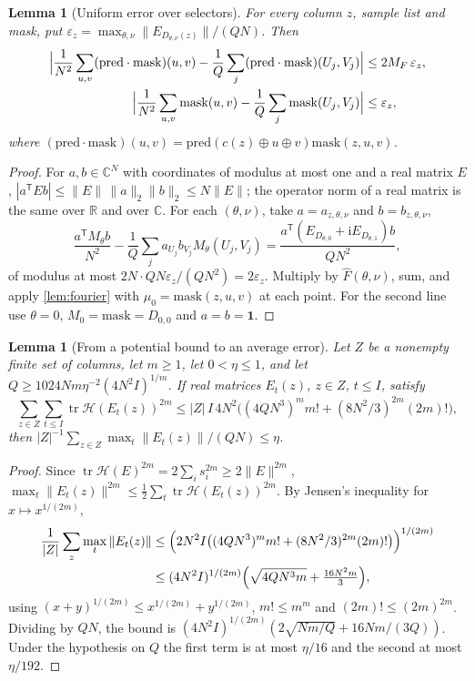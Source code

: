 \documentclass[11pt,letterpaper]{article}
\newtheorem{lemma}[theorem]{Lemma}
\theoremstyle{definition}
\theoremstyle{remark}
\newcommand{\R}{\mathbb R}
\newcommand{\C}{\mathbb C}
\newcommand{\tr}{\operatorname{tr}}
\newcommand{\mask}{\mathrm{mask}}
\newcommand{\pred}{\mathrm{pred}}
\newcommand{\cH}{\mathcal H}
\newcommand{\iu}{\mathrm i}
\begin{document}
\begin{lemma}[Uniform error over selectors]\label{lem:selector}
For every column \(z\), sample list and mask, put
\(\varepsilon_z=\max_{\theta,\nu}\|E_{D_{\theta,\nu}(z)}\|/(QN)\). Then
\begin{align*}
 \Bigl|\frac1{N^2}\sum_{u,v}(\pred\cdot\mask)(u,v)-\frac1Q\sum_{j}(\pred\cdot\mask)(U_j,V_j)\Bigr|
 &\le2M_F\,\varepsilon_z,\\
 \Bigl|\frac1{N^2}\sum_{u,v}\mask(u,v)-\frac1Q\sum_{j}\mask(U_j,V_j)\Bigr|&\le\varepsilon_z ,
\end{align*}
where \((\pred\cdot\mask)(u,v)=\pred(c(z)\oplus u\oplus v)\mask(z,u,v)\).
\end{lemma}
\begin{proof}
For \(a,b\in\C^N\) with coordinates of modulus at most one and a real
matrix \(E\), \(|a^{\mathsf T}Eb|\le\|E\|\,\|a\|_2\|b\|_2\le N\|E\|\);
the operator norm of a real matrix is the same over \(\R\) and over
\(\C\). For each \((\theta,\nu)\), take \(a=a_{z,\theta,\nu}\) and
\(b=b_{z,\theta,\nu}\),
\[
 \frac{a^{\mathsf T}M_\theta b}{N^2}-\frac1Q\sum_ja_{U_j}b_{V_j}M_\theta(U_j,V_j)
 =\frac{a^{\mathsf T}(E_{D_{\theta,0}}+\iu E_{D_{\theta,1}})b}{QN^2},
\]
of modulus at most \(2N\cdot QN\varepsilon_z/(QN^2)=2\varepsilon_z\).
Multiply by \(\widehat F(\theta,\nu)\), sum, and apply
\cref{lem:fourier} with \(\mu_0=\mask(z,u,v)\) at each point. For the
second line use \(\theta=0\), \(M_0=\mask=D_{0,0}\) and
\(a=b=\mathbf 1\).
\end{proof}

\begin{lemma}[From a potential bound to an average error]\label{lem:root}
Let \(Z\) be a nonempty finite set of columns, let \(m\ge1\), let
\(0<\eta\le1\), and let \(Q\ge1024Nm\eta^{-2}(4N^2I)^{1/m}\). If real
matrices \(E_t(z)\), \(z\in Z\), \(t\le I\), satisfy
\[
 \sum_{z\in Z}\sum_{t\le I}\tr\cH(E_t(z))^{2m}
 \le|Z|\,I\,4N^2\bigl((4QN^3)^mm!+(8N^2/3)^{2m}(2m)!\bigr),
\]
then \(|Z|^{-1}\sum_{z\in Z}\max_t\|E_t(z)\|/(QN)\le\eta\).
\end{lemma}
\begin{proof}
Since \(\tr\cH(E)^{2m}=2\sum_is_i^{2m}\ge2\|E\|^{2m}\),
\(\max_t\|E_t(z)\|^{2m}\le\frac12\sum_t\tr\cH(E_t(z))^{2m}\). By Jensen's
inequality for \(x\mapsto x^{1/(2m)}\),
\begin{align*}
 \frac1{|Z|}\sum_z\max_t\|E_t(z)\|
 &\le\Bigl(2N^2I\bigl((4QN^3)^mm!+(8N^2/3)^{2m}(2m)!\bigr)\Bigr)^{1/(2m)}\\
 &\le(4N^2I)^{1/(2m)}\Bigl(\sqrt{4QN^3m}+\tfrac{16N^2m}{3}\Bigr),
\end{align*}
using \((x+y)^{1/(2m)}\le x^{1/(2m)}+y^{1/(2m)}\), \(m!\le m^m\) and
\((2m)!\le(2m)^{2m}\). Dividing by \(QN\), the bound is
\((4N^2I)^{1/(2m)}(2\sqrt{Nm/Q}+16Nm/(3Q))\). Under the hypothesis on
\(Q\) the first term is at most \(\eta/16\) and the second at most
\(\eta/192\).
\end{proof}
\end{document}
